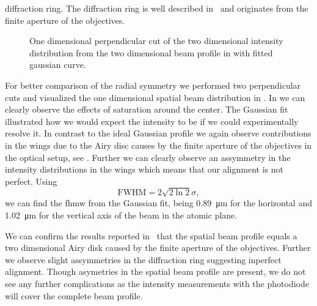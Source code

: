 diffraction ring. The diffraction ring is well described
in~\cite{Hertlein2017} and originates from the finite aperture of the
objectives.
\begin{figure}[htb]
  \centering
  \begin{adjustbox}{width=\textwidth}
    
  \end{adjustbox}
  \caption{One dimensional perpendicular cut of the two dimensional intensity
    distribution from the two dimensional beam profile in
     with fitted gaussian curve.
  }\label{fig:intensity_spatial_profile}
\end{figure}
For better comparison of the radial symmetry we performed two perpendicular
cuts and visualized the one dimensional spatial beam distribution in
.
In  we can clearly observe the effects of
saturation around the center. The Gaussian fit illustrated how we would expect
the intensity to be if we could experimentally resolve it. In contrast to the
ideal Gaussian profile we again observe contributions in the wings due to the
Airy disc causes by the finite aperture of the objectives in the optical setup,
see . Further we can clearly observe
an assymmetry in the intensity distributions in the wings which means that
our alignment is not perfect. Using
\begin{equation}
  \text{FWHM}=2\sqrt{2\ln2}\sigma
  \label{eq:fwhm_sigma},
\end{equation}
we can find the \gls{fhmw} from the Gaussian fit, being
\SI{0.89}{\micro\meter} for the horizontal and \SI{1.02}{\micro\meter} for
the vertical axis of the beam in the atomic plane.

We can confirm the results reported in~\cite{Hertlein2017} that the spatial
beam profile equals a two dimensional Airy disk caused by the finite
aperture of the objectives. Further we observe slight assymmetries in the
diffraction ring suggesting inperfect alignment. Though asymetries in the
spatial beam profile are present, we do not see any further complications as
the intensity measurements with the photodiode will cover the complete beam
profile.

